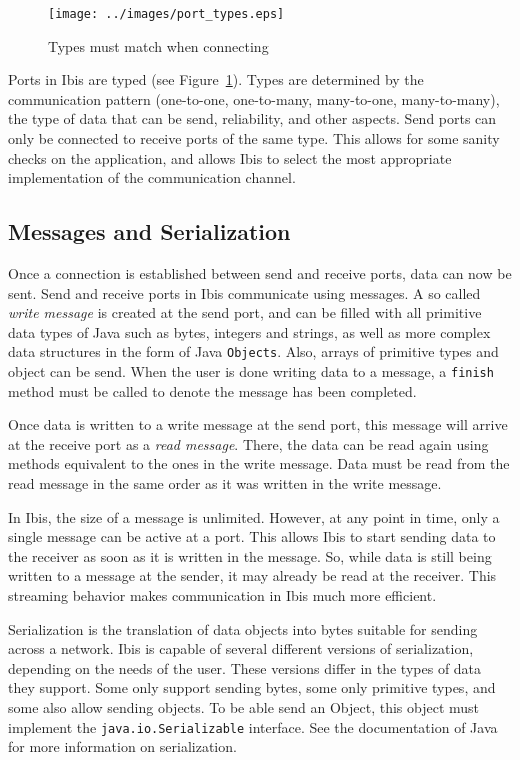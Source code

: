 \documentclass[10pt]{article}
\begin{document}
\begin{figure} \centering
\texttt{[image: ../images/port\_types.eps]}
\caption{\label{port_types}Types must match when connecting} 
\end{figure}

Ports in Ibis are typed (see Figure~\ref{port_types}). Types are
determined by the communication pattern (one-to-one, one-to-many,
many-to-one, many-to-many), the type of data that can be send,
reliability, and other aspects. Send ports can only be connected to receive
ports of the same type. This allows for some sanity checks on the
application, and allows Ibis to select the most appropriate
implementation of the communication channel.

\subsection{Messages and Serialization}


Once a connection is established between send and receive ports, data
can now be sent. Send and receive ports in Ibis communicate using
messages. A so called \emph{write message} is created at the send port,
and can be filled with all primitive data types of Java such as bytes, integers
and strings, as well as more complex data structures in the form of
Java \texttt{Objects}. Also, arrays of primitive types and object can be
send. When the user is done writing data to a message, a \texttt{finish}
method must be called to denote the message has been completed.

Once data is written to a write message at the send port, this message
will arrive at the receive port as a \emph{read message}. There, the
data can be read again using methods equivalent to the ones in the write
message. Data must be read from the read message in the same order as it
was written in the write message.

In Ibis, the size of a message is unlimited. However, at any point in
time, only a single message can be active at a port. This allows Ibis to
start sending data to the receiver as soon as it is written in the
message. So, while data is still being written to a message at the
sender, it may already be read at the receiver. This streaming behavior
makes communication in Ibis much more efficient.

Serialization is the translation of data objects into bytes suitable for
sending across a network. Ibis is capable of several different versions
of serialization, depending on the needs of the user. These versions
differ in the types of data they support. Some only support sending
bytes, some only primitive types, and some also allow sending objects.
To be able send an Object, this object must implement the
\texttt{java.io.Serializable} interface. See the documentation of Java
for more information on serialization.
\end{document}
